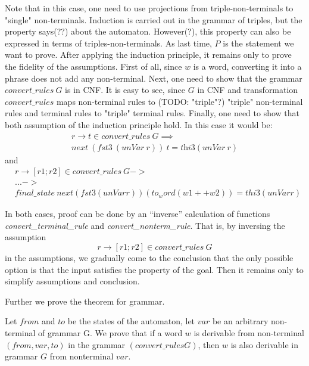 Note that in this case, one need to use projections from triple-non-terminals to "single" non-terminals. Induction is carried out in the grammar of triples, but the property says(??) about the automaton. However(?), this property can also be expressed in terms of triples-non-terminals.
As last time, $P$ is the statement we want to prove.
After applying the induction principle, it remains only to prove the fidelity of the assumptions.
First of all, since $ w $ is a word, converting it into a phrase does not add any non-terminal.
Next, one need to show that the grammar $convert\_rules \ G$ is in CNF. It is easy to see, since $G$ in CNF and transformation $convert\_rules$ maps non-terminal rules to (TODO: "triple"?) "triple" non-terminal rules and terminal rules to "triple" terminal rules.
Finally, one need to show that both assumption of the induction principle hold.  
In this case it would be: 
\begin{align*}
r \to t  \in \textit{convert\_rules} \ G \implies \\ 
next \ (\textit{fst3} \ (\textit{unVar} \ r)) \ t = \textit{thi3} (\textit{unVar} \ r) 
\end{align*}
and 
\begin{align*}
& r \to [r1; r2] \in \textit{convert\_rules} \ G  -> \\
& ... -> \\
& \textit{final\_state} \ \textit{next} (fst3 (unVar r)) (to_word (w1 ++ w2)) = thi3 (unVar r)
\end{align*}

In both cases, proof can be done by an ``inverse'' calculation of functions \textit{convert\_terminal\_rule} and \textit{convert\_nonterm\_rule}. 
That is, by inversing the assumption $$ r \to [r1; r2] \in \textit{convert\_rules} \ G$$ in the assumptions, we gradually come to the conclusion that the only possible option is that the input satisfies the property of the goal. Then it remains only to simplify assumptions and conclusion.


Further we prove the theorem for grammar.

\begin{theorem}
	Let $from$ and $to$ be the states of the automaton, let $var$ be an arbitrary non-terminal of grammar G. We prove that if a word $w$ is derivable from non-terminal $(from, var, to)$ in the grammar $(convert\_rules G)$, then $w$ is also derivable in grammar $G$ from nonterminal $var$.
\end{theorem}

